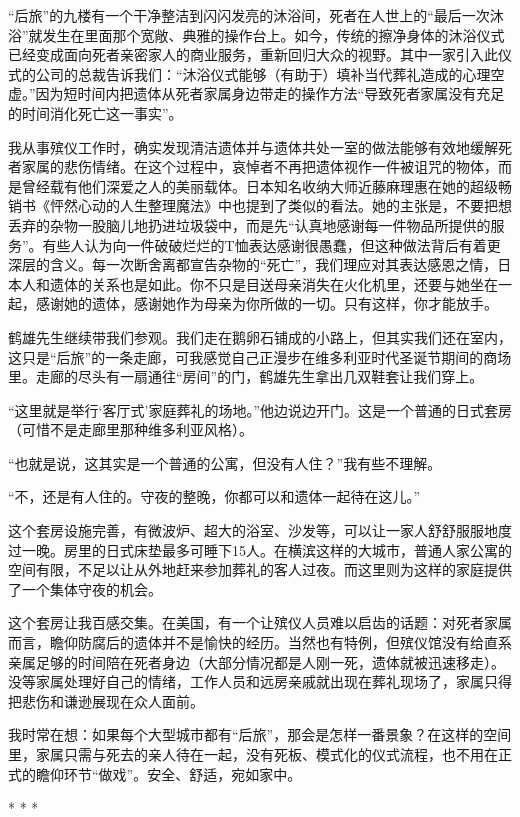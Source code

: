 \documentclass[12pt,oneside]{book}
\begin{document}
\begin{bookref}[frametitle={\cite{好好告别：世界葬礼观察手记}}]
“后旅”的九楼有一个干净整洁到闪闪发亮的沐浴间，死者在人世上的“最后一次沐浴”就发生在里面那个宽敞、典雅的操作台上。如今，传统的擦净身体的沐浴仪式已经变成面向死者亲密家人的商业服务，重新回归大众的视野。其中一家引入此仪式的公司的总裁告诉我们：“沐浴仪式能够（有助于）填补当代葬礼造成的心理空虚。”因为短时间内把遗体从死者家属身边带走的操作方法“导致死者家属没有充足的时间消化死亡这一事实”。

我从事殡仪工作时，确实发现清洁遗体并与遗体共处一室的做法能够有效地缓解死者家属的悲伤情绪。在这个过程中，哀悼者不再把遗体视作一件被诅咒的物体，而是曾经载有他们深爱之人的美丽载体。日本知名收纳大师近藤麻理惠在她的超级畅销书《怦然心动的人生整理魔法》中也提到了类似的看法。她的主张是，不要把想丢弃的杂物一股脑儿地扔进垃圾袋中，而是先“认真地感谢每一件物品所提供的服务”。有些人认为向一件破破烂烂的T恤表达感谢很愚蠢，但这种做法背后有着更深层的含义。每一次断舍离都宣告杂物的“死亡”，我们理应对其表达感恩之情，日本人和遗体的关系也是如此。你不只是目送母亲消失在火化机里，还要与她坐在一起，感谢她的遗体，感谢她作为母亲为你所做的一切。只有这样，你才能放手。

鹤雄先生继续带我们参观。我们走在鹅卵石铺成的小路上，但其实我们还在室内，这只是“后旅”的一条走廊，可我感觉自己正漫步在维多利亚时代圣诞节期间的商场里。走廊的尽头有一扇通往“房间”的门，鹤雄先生拿出几双鞋套让我们穿上。

“这里就是举行‘客厅式’家庭葬礼的场地。”他边说边开门。这是一个普通的日式套房（可惜不是走廊里那种维多利亚风格）。

“也就是说，这其实是一个普通的公寓，但没有人住？”我有些不理解。

“不，还是有人住的。守夜的整晚，你都可以和遗体一起待在这儿。”

这个套房设施完善，有微波炉、超大的浴室、沙发等，可以让一家人舒舒服服地度过一晚。房里的日式床垫最多可睡下15人。在横滨这样的大城市，普通人家公寓的空间有限，不足以让从外地赶来参加葬礼的客人过夜。而这里则为这样的家庭提供了一个集体守夜的机会。

这个套房让我百感交集。在美国，有一个让殡仪人员难以启齿的话题：对死者家属而言，瞻仰防腐后的遗体并不是愉快的经历。当然也有特例，但殡仪馆没有给直系亲属足够的时间陪在死者身边（大部分情况都是人刚一死，遗体就被迅速移走）。没等家属处理好自己的情绪，工作人员和远房亲戚就出现在葬礼现场了，家属只得把悲伤和谦逊展现在众人面前。

我时常在想：如果每个大型城市都有“后旅”，那会是怎样一番景象？在这样的空间里，家属只需与死去的亲人待在一起，没有死板、模式化的仪式流程，也不用在正式的瞻仰环节“做戏”。安全、舒适，宛如家中。
\begin{center}
* * *
\end{center}


\end{bookref}
\end{document}
